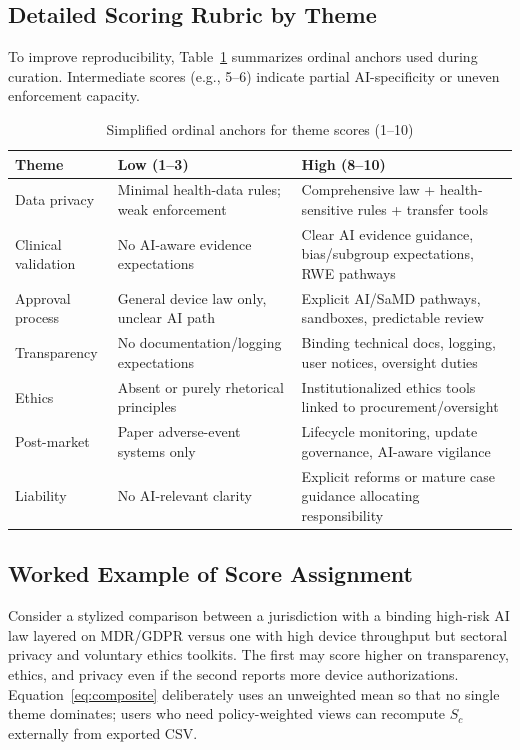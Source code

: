 \subsection{Detailed Scoring Rubric by Theme}
\label{sec:rubric}

To improve reproducibility, Table~\ref{tab:rubric} summarizes ordinal anchors used during curation. Intermediate scores (e.g., 5--6) indicate partial AI-specificity or uneven enforcement capacity.

\begin{table}[htbp]
\centering
\caption{Simplified ordinal anchors for theme scores (1--10)}
\label{tab:rubric}
\begin{tabular}{@{}p{2.4cm}p{4.0cm}p{4.2cm}@{}}
\toprule
\textbf{Theme} & \textbf{Low (1--3)} & \textbf{High (8--10)} \\
\midrule
Data privacy & Minimal health-data rules; weak enforcement & Comprehensive law + health-sensitive rules + transfer tools \\
Clinical validation & No AI-aware evidence expectations & Clear AI evidence guidance, bias/subgroup expectations, RWE pathways \\
Approval process & General device law only, unclear AI path & Explicit AI/SaMD pathways, sandboxes, predictable review \\
Transparency & No documentation/logging expectations & Binding technical docs, logging, user notices, oversight duties \\
Ethics & Absent or purely rhetorical principles & Institutionalized ethics tools linked to procurement/oversight \\
Post-market & Paper adverse-event systems only & Lifecycle monitoring, update governance, AI-aware vigilance \\
Liability & No AI-relevant clarity & Explicit reforms or mature case guidance allocating responsibility \\
\bottomrule
\end{tabular}
\end{table}

\subsection{Worked Example of Score Assignment}
\label{sec:worked}

Consider a stylized comparison between a jurisdiction with a binding high-risk AI law layered on MDR/GDPR versus one with high device throughput but sectoral privacy and voluntary ethics toolkits. The first may score higher on transparency, ethics, and privacy even if the second reports more device authorizations. Equation~\eqref{eq:composite} deliberately uses an unweighted mean so that no single theme dominates; users who need policy-weighted views can recompute $S_c$ externally from exported CSV.

